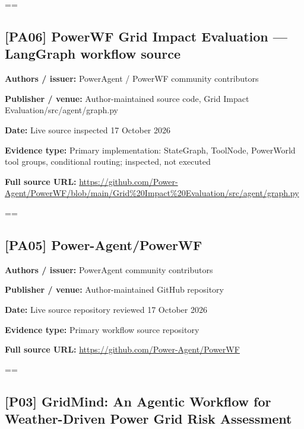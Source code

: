 \documentclass[10pt,letterpaper]{article}
\begin{document}
\setbox\readingEntry=\vbox\bgroup\hsize=\linewidth\subsection*{[PA06] PowerWF Grid Impact Evaluation --- LangGraph workflow source}
\textbf{Authors / issuer:} PowerAgent / PowerWF community contributors\par
\textbf{Publisher / venue:} Author-maintained source code, Grid Impact Evaluation/src/agent/graph.py\par
\textbf{Date:} Live source inspected 17 October 2026\par
\textbf{Evidence type:} Primary implementation: StateGraph, ToolNode, PowerWorld tool groups, conditional routing; inspected, not executed\par
\textbf{Full source URL:} \href{https://github.com/Power-Agent/PowerWF/blob/main/Grid\%20Impact\%20Evaluation/src/agent/graph.py}{\small\ttfamily https:/\allowbreak{}/\allowbreak{}github.\allowbreak{}com/\allowbreak{}Power-\allowbreak{}Agent/\allowbreak{}PowerWF/\allowbreak{}blob/\allowbreak{}main/\allowbreak{}Grid\%\allowbreak{}20Impact\%\allowbreak{}20Evaluation/\allowbreak{}src/\allowbreak{}agent/\allowbreak{}graph.\allowbreak{}py}\par
\egroup\par\noindent\box\readingEntry\par\medskip
\setbox\readingEntry=\vbox\bgroup\hsize=\linewidth\subsection*{[PA05] Power-Agent/PowerWF}
\textbf{Authors / issuer:} PowerAgent community contributors\par
\textbf{Publisher / venue:} Author-maintained GitHub repository\par
\textbf{Date:} Live source repository reviewed 17 October 2026\par
\textbf{Evidence type:} Primary workflow source repository\par
\textbf{Full source URL:} \href{https://github.com/Power-Agent/PowerWF}{\small\ttfamily https:/\allowbreak{}/\allowbreak{}github.\allowbreak{}com/\allowbreak{}Power-\allowbreak{}Agent/\allowbreak{}PowerWF}\par
\egroup\par\noindent\box\readingEntry\par\medskip
\setbox\readingEntry=\vbox\bgroup\hsize=\linewidth\subsection*{[P03] GridMind: An Agentic Workflow for Weather-Driven Power Grid Risk Assessment}
\end{document}
